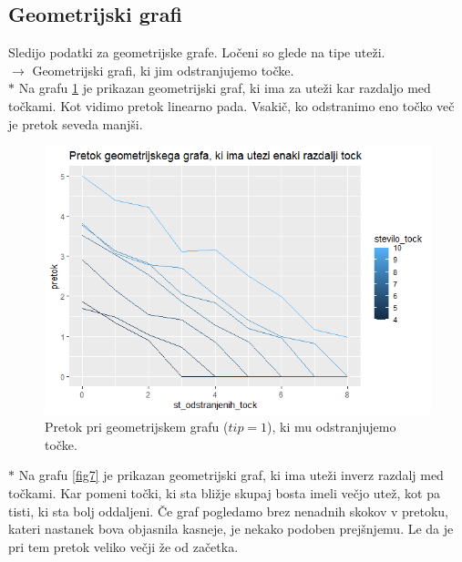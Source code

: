 \documentclass[a4paper]{article}
\begin{document}
\subsection{Geometrijski grafi}
Sledijo podatki za geometrijske grafe. Ločeni so glede na tipe uteži. \\

$\rightarrow $ Geometrijski grafi, ki jim odstranjujemo točke. \\

$\ast$ Na grafu \ref{fig6} je prikazan geometrijski graf, ki ima za uteži kar razdaljo med točkami. Kot vidimo pretok linearno pada. Vsakič, ko odstranimo eno točko več je pretok seveda manjši.

\begin{figure}[H]
\centerline{\includegraphics[scale=.5]{p6_1.PNG}}
\caption{Pretok pri geometrijskem grafu ($tip = 1$), ki mu odstranjujemo točke.}
\label{fig6}
\end{figure}

$\ast$  Na grafu \ref{fig7} je prikazan geometrijski graf, ki ima uteži inverz razdalj med točkami. Kar pomeni točki, ki sta bližje skupaj bosta imeli večjo utež, kot pa tisti, ki sta bolj oddaljeni. Če graf pogledamo brez nenadnih skokov v pretoku, kateri nastanek bova objasnila kasneje, je nekako podoben prejšnjemu. Le da je pri tem pretok veliko večji že od začetka. 
\end{document}
